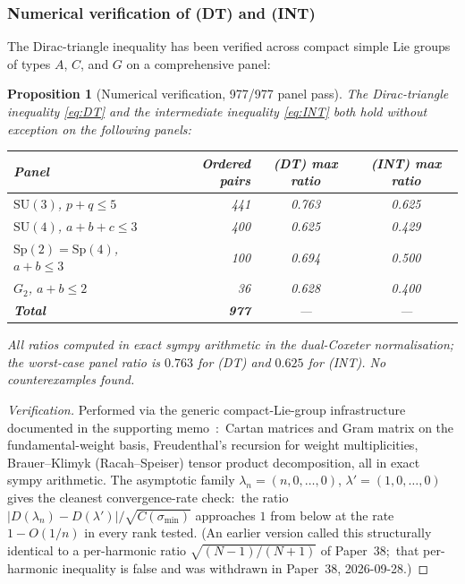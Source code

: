\documentclass[11pt,a4paper]{article}
\theoremstyle{plain}
\newtheorem{proposition}[theorem]{Proposition}
\theoremstyle{definition}
\newcommand{\SU}{\mathrm{SU}}
\newcommand{\Sp}{\mathrm{Sp}}
\newcommand{\Cas}{C}
\newcommand{\Dop}{D}
\begin{document}
\subsubsection{Numerical verification of (DT) and (INT)}\label{sec:L3_numerical}

The Dirac-triangle inequality has been verified across compact simple
Lie groups of types $A$, $C$, and $G$ on a comprehensive panel:

\begin{proposition}[Numerical verification, 977/977 panel
pass]\label{prop:dt_verification}
The Dirac-triangle inequality \eqref{eq:DT} and the intermediate
inequality \eqref{eq:INT} both hold without exception on the following
panels:
\begin{center}
\begin{tabular}{lrcc}
\toprule
Panel & Ordered pairs & (DT) max ratio & (INT) max ratio \\
\midrule
$\SU(3)$, $p + q \le 5$ & 441 & 0.763 & 0.625 \\
$\SU(4)$, $a + b + c \le 3$ & 400 & 0.625 & 0.429 \\
$\Sp(2) = \Sp(4)$, $a + b \le 3$ & 100 & 0.694 & 0.500 \\
$G_2$, $a + b \le 2$ & 36 & 0.628 & 0.400 \\
\midrule
\textbf{Total} & \textbf{977} & --- & --- \\
\bottomrule
\end{tabular}
\end{center}
All ratios computed in exact sympy arithmetic in the dual-Coxeter
normalisation; the worst-case panel ratio is $0.763$ for (DT) and
$0.625$ for (INT). No counterexamples found.
\end{proposition}

\begin{proof}[Verification]
Performed via the generic compact-Lie-group infrastructure documented in
the supporting memo~\cite{dirac_triangle_memo}:\ Cartan matrices and
Gram matrix on the fundamental-weight basis, Freudenthal's recursion
for weight multiplicities, Brauer--Klimyk (Racah--Speiser) tensor
product decomposition, all in exact sympy arithmetic. The asymptotic
family $\lambda_n = (n, 0, \ldots, 0)$, $\lambda' = (1, 0, \ldots, 0)$
gives the cleanest convergence-rate check:\ the ratio
$|\Dop(\lambda_n) - \Dop(\lambda')|/\sqrt{\Cas(\sigma_{\min})}$
approaches $1$ from below at the rate $1 - O(1/n)$ in every rank
tested.  (An earlier version called this structurally identical to a
per-harmonic ratio $\sqrt{(N-1)/(N+1)}$ of Paper~38;\ that per-harmonic
inequality is false and was withdrawn in Paper~38, 2026-09-28.)
\end{proof}
\end{document}
